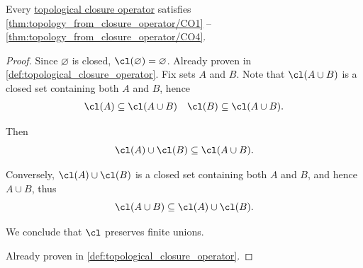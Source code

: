 \begin{proposition}\label{thm:topological_closure_operator_can_generate_topology}
  Every \hyperref[def:topological_closure_operator]{topological closure operator} satisfies \ref{thm:topology_from_closure_operator/CO1} -- \ref{thm:topology_from_closure_operator/CO4}.
\end{proposition}
\begin{proof}
   Since \( \varnothing \) is closed, \( \cl(\varnothing) = \varnothing \).
   Already proven in \cref{def:topological_closure_operator}.
   Fix sets \( A \) and \( B \). Note that \( \cl(A \cup B) \) is a closed set containing both \( A \) and \( B \), hence
  \begin{align*}
    \cl(A) \subseteq \cl(A \cup B)
    &&
    \cl(B) \subseteq \cl(A \cup B).
  \end{align*}

  Then
  \begin{equation*}
    \cl(A) \cup \cl(B) \subseteq \cl(A \cup B).
  \end{equation*}

  Conversely, \( \cl(A) \cup \cl(B) \) is a closed set containing both \( A \) and \( B \), and hence \( A \cup B \), thus
  \begin{equation*}
    \cl(A \cup B) \subseteq \cl(A) \cup \cl(B).
  \end{equation*}

  We conclude that \( \cl \) preserves finite unions.

   Already proven in \cref{def:topological_closure_operator}.
\end{proof}

